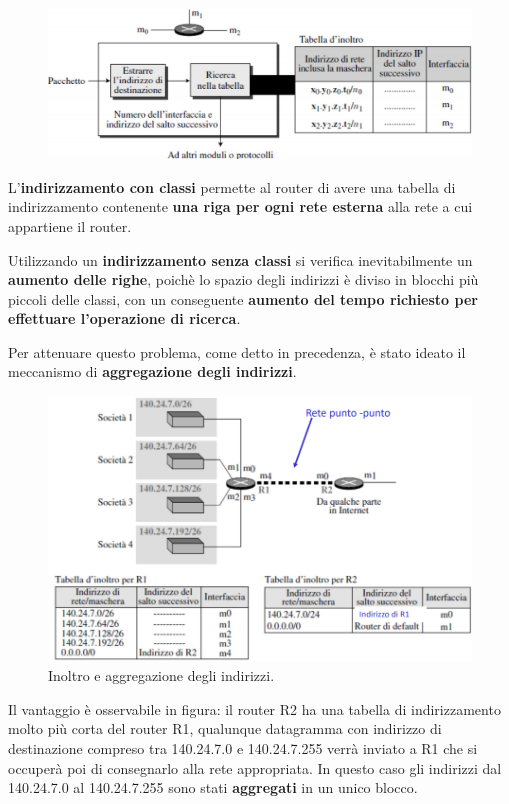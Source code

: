 \documentclass[11pt,a4paper,oneside]{book}
\theoremstyle{definition}
\begin{document}
\pagebreak

\begin{figure}[!h]
	\includegraphics[scale=0.2]{Immagini/Ip_forw.png}
	\centering
\end{figure}

L'\textbf{indirizzamento con classi} permette al router di avere una tabella di indirizzamento contenente \textbf{una riga per ogni rete esterna} alla rete a cui appartiene il router.

Utilizzando un \textbf{indirizzamento senza classi} si verifica inevitabilmente un \textbf{aumento delle righe}, poichè lo spazio degli indirizzi è diviso in blocchi più piccoli delle classi, con un conseguente \textbf{aumento del tempo richiesto per effettuare l'operazione di ricerca}.

Per attenuare questo problema, come detto in precedenza, è stato ideato il meccanismo di \textbf{aggregazione degli indirizzi}.

\begin{figure}[!h]
	\includegraphics[scale=0.37]{Immagini/Ip_aggre.png}
	\centering
	\caption{Inoltro e aggregazione degli indirizzi.}
\end{figure}

Il vantaggio è osservabile in figura: il router R2 ha una tabella di indirizzamento molto più corta del router R1, qualunque datagramma con indirizzo di destinazione compreso tra 140.24.7.0 e 140.24.7.255 verrà inviato a R1 che si occuperà poi di consegnarlo alla rete appropriata. In questo caso gli indirizzi dal 140.24.7.0 al 140.24.7.255 sono stati \textbf{aggregati} in un unico blocco.
\end{document}
